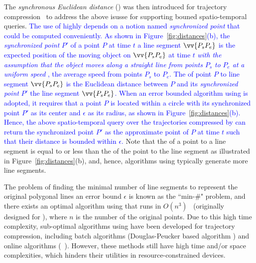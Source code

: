 The \emph{synchronous Euclidean distance} (\sed) was then introduced for trajectory compression~\cite{Meratnia:Spatiotemporal, Cao:Spatio, Potamias:Sampling, Muckell:Compression, Chen:Fast} to address the above isusse for supporting bouned spatio-temporal queries.
\textcolor{blue}{The use of \sed highly depends on a notion named \emph{synchronized point} \cite{Meratnia:Spatiotemporal,Cao:Spatio} that could be computed conveniently. As shown in Figure~\ref{fig:distances}(b), the \emph{synchronized point} $P'$ of a point $P$ at time $t$ \wrt a line segment $\vv{P_sP_e}$  is the expected position of the moving object on $\vv{P_sP_e}$ at time $t$ \emph{with the assumption that the object moves along a straight line from points $P_s$ to $P_e$ at a uniform speed} \cite{Cao:Spatio}, \ie the average speed from points $P_s$ to $P_e$.}
\textcolor{blue}{The \sed of point $P$ to line segment $\vv{P_sP_e}$ is the Euclidean distance between $P$ and its \emph{synchronized point} $P'$  \wrt the line segment $\vv{P_sP_e}$.}
\textcolor{blue}{When an error bounded \lsa algorithm using \sed is adopted, it requires that a point $P$ is located within a circle with its synchronized point $P'$  as its center and $\epsilon$ as its radius, as shown in Figure~\ref{fig:distances}(b).}
\textcolor{blue}{Hence, the above spatio-temporal query over the trajectories compressed by \sed can return the synchronized point $P'$ as the approximate point of $P$ at time $t$ such that their distance is bounded within $\epsilon$.}
%
Note that the \sed of a point to a line segment is equal to or less than the \ped of the point to the line segment as illustrated in Figure~\ref{fig:distances}(b), and, hence, \lsa algorithms using \sed typically generate more line segments.




%
%

The problem of finding the minimal number of line segments to represent the original polygonal lines \wrt an error bound $\epsilon$ is known as the ``min-\#" problem\cite{Imai:Optimal,Chan:Optimal}, and there exists an optimal \lsa algorithm using \sed that runs in $O(n^3)$~\cite{Imai:Optimal} (originally designed for \ped ),  where $n$ is the number of the original points.
Due to this high time complexity, sub-optimal \lsa algorithms using \sed have been developed for trajectory compression, including batch algorithms (\eg Douglas-Peucker based algorithm \dpsed \cite{Meratnia:Spatiotemporal}) and online algorithms (\eg\ \squishe \cite{Muckell:Compression}).
However, these methods still have high time and/or space complexities, which hinders their utilities in resource-constrained devices. %


